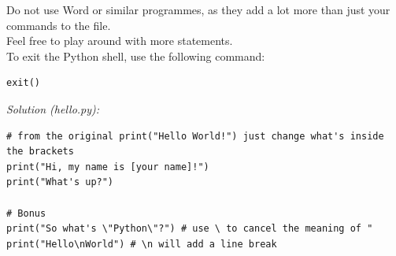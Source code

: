 \documentclass{article}
\begin{document}
Do not use Word or similar programmes, as they add a lot more than just your commands to the file.\\
Feel free to play around with more statements.\\
To exit the Python shell, use the following command:
\begin{lstlisting}
exit()
\end{lstlisting}
\textit{Solution (hello.py):}
\begin{lstlisting}
# from the original print("Hello World!") just change what's inside the brackets
print("Hi, my name is [your name]!")
print("What's up?")

# Bonus
print("So what's \"Python\"?") # use \ to cancel the meaning of "
print("Hello\nWorld") # \n will add a line break
\end{lstlisting}

\end{document}
